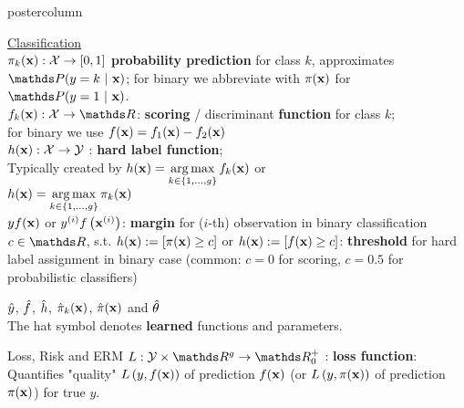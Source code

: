 \documentclass{beamer}
\begin{document}
\begin{frame}[fragile]{}
\begin{columns}
\begin{column}{.31\textwidth}
\begin{beamercolorbox}[center]{postercolumn}
\begin{minipage}{.98\textwidth}
{\begin{myblock}{}


\underline{Classification}\\

$\pi_{k}(\mathbf{x}) : \mathcal{X} \rightarrow [0,1]$ \textbf{probability prediction} for class $k$, approximates $\postk$;
for binary we abbreviate with $\pi(\mathbf{x})$ for $\post$.\\
 
$\fkx: \Xspace \rightarrow \R$: \textbf{scoring} / discriminant \textbf{function} for class $k$;\\
for binary we use $f(\mathbf{x}) = f_{1}(\mathbf{x}) - f_{2}(\mathbf{x})$\\
 
$h(\mathbf{x}): \mathcal{X} \rightarrow \mathcal{Y}$ : \textbf{hard label function};\\ 
Typically created by $h(\mathbf{x}) = \mathop{\mathrm{arg\,max}} \limits_{k \in \{1, \ldots, g\}} f_{k}(\mathbf{x})$ or \\ $h(\mathbf{x}) = \mathop{\mathrm{arg\,max}} \limits_{k \in \{1, \ldots, g\}} \pi_{k}(\mathbf{x})$  \\

$y f(\mathbf{x})$ or $y^{(i)} f\left(\mathbf{x}^{(i)}\right)$: \textbf{margin} for ($i$-th) observation in binary classification\\%

$c \in \R$, s.t. $h(\mathbf{x}) := [\pi(\mathbf{x}) \geq c]$ or $h(\mathbf{x}) := [f(\mathbf{x}) \geq c]$: \textbf{threshold} for hard label assignment in binary case (common: $c = 0$ for scoring, $c = 0.5$ for probabilistic classifiers)

\vspace{1cm}

$\hat{y}$, $\hat{f}$, $\hat{h}$, $\hat \pi_{k}(\mathbf{x})$, $\hat \pi(\mathbf{x})$ and $\hat{\theta}$ \\
The hat symbol denotes \textbf{learned} functions and parameters.

\end{myblock}

\begin{myblock}{Loss, Risk and ERM}
  $L: \Yspace \times \R^g \to \R^+_0$ : \textbf{loss function}: 
 Quantifies "quality" $L\left(y, f(\mathbf{x})\right)$ of prediction $f(\mathbf{x})$ (or $L\left(y, \pi(\mathbf{x})\right)$ of prediction $\pi(\mathbf{x})$) for true $y$. \\


\end{myblock}}
\end{minipage}
\end{beamercolorbox}
\end{column}
\end{columns}
\end{frame}
\end{document}
